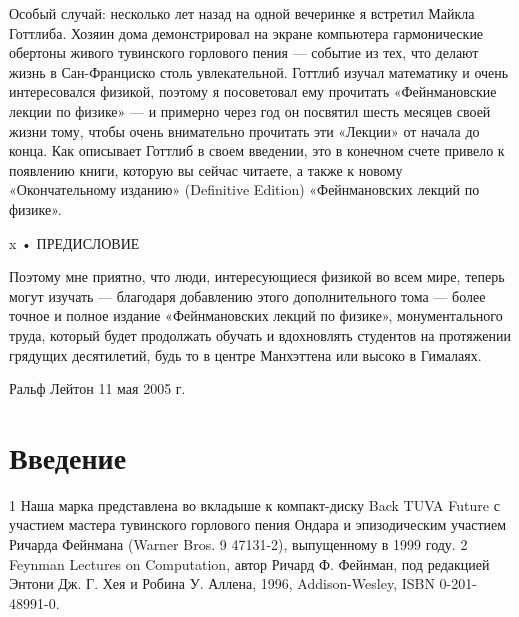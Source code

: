\documentclass[11pt,oneside]{article}
\begin{document}
Особый случай: несколько лет назад на одной вечеринке я встретил Майкла Готтлиба. Хозяин дома демонстрировал на экране компьютера гармонические обертоны живого тувинского горлового пения --- событие из тех, что делают жизнь в Сан-Франциско столь увлекательной. Готтлиб изучал математику и очень интересовался физикой, поэтому я посоветовал ему прочитать «Фейнмановские лекции по физике» --- и примерно через год он посвятил шесть месяцев своей жизни тому, чтобы очень внимательно прочитать эти «Лекции» от начала до конца. Как описывает Готтлиб в своем введении, это в конечном счете привело к появлению книги, которую вы сейчас читаете, а также к новому «Окончательному изданию» (Definitive Edition) «Фейнмановских лекций по физике».\par



x • ПРЕДИСЛОВИЕ\par



Поэтому мне приятно, что люди, интересующиеся физикой во всем мире, теперь могут изучать --- благодаря добавлению этого дополнительного тома --- более точное и полное издание «Фейнмановских лекций по физике», монументального труда, который будет продолжать обучать и вдохновлять студентов на протяжении грядущих десятилетий, будь то в центре Манхэттена или высоко в Гималаях.\par



Ральф Лейтон 11 мая 2005 г.\par



\clearpage


\section*{Введение}



\label{tips-sec-3-введение}


1 Наша марка представлена во вкладыше к компакт-диску Back TUVA Future с участием мастера тувинского горлового пения Ондара и эпизодическим участием Ричарда Фейнмана (Warner Bros. 9 47131-2), выпущенному в 1999 году. 2 Feynman Lectures on Computation, автор Ричард Ф. Фейнман, под редакцией Энтони Дж. Г. Хея и Робина У. Аллена, 1996, Addison-Wesley, ISBN 0-201-48991-0.\par
\end{document}
